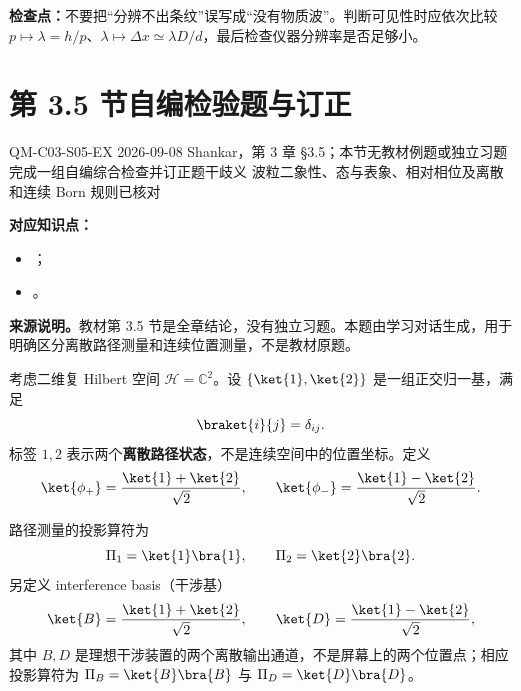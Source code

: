 \textbf{检查点：}不要把“分辨不出条纹”误写成“没有物质波”。判断可见性时应依次比较 $p\mapsto\lambda=h/p$、$\lambda\mapsto\Delta x\simeq\lambda D/d$，最后检查仪器分辨率是否足够小。

\section{第 3.5 节自编检验题与订正}
\label{exercise-set:QM-C03-S05}

\exercisemeta
  {QM-C03-S05-EX}
  {2026-09-08}
  {Shankar，第 3 章 \S 3.5；本节无教材例题或独立习题}
  {完成一组自编综合检查并订正题干歧义}
  {波粒二象性、态与表象、相对相位及离散和连续 Born 规则已核对}


\textbf{对应知识点：}
\begin{itemize}[leftmargin=*]
  \item {}；
  \item {}。
\end{itemize}

\textbf{来源说明。}教材第 3.5 节是全章结论，没有独立习题。本题由学习对话生成，用于明确区分离散路径测量和连续位置测量，不是教材原题。

考虑二维复 Hilbert 空间 $\mathcal H=\mathbb C^2$。设 $\{\ket{1},\ket{2}\}$ 是一组正交归一基，满足
\[
  \braket{i}{j}=\delta_{ij}.
\]
标签 $1,2$ 表示两个\textbf{离散路径状态}，不是连续空间中的位置坐标。定义
\begin{equation}
  \ket{\phi_+}
  =\frac{\ket{1}+\ket{2}}{\sqrt2},
  \qquad
  \ket{\phi_-}
  =\frac{\ket{1}-\ket{2}}{\sqrt2}.
  \label{eq:QM-C03-S05-E01-phase-states}
\end{equation}

路径测量的投影算符为
\[
  \Pi_1=\ket{1}\bra{1},
  \qquad
  \Pi_2=\ket{2}\bra{2}.
\]
另定义 interference basis（干涉基）
\begin{equation}
  \ket{B}
  =\frac{\ket{1}+\ket{2}}{\sqrt2},
  \qquad
  \ket{D}
  =\frac{\ket{1}-\ket{2}}{\sqrt2},
  \label{eq:QM-C03-S05-E01-interference-basis}
\end{equation}
其中 $B,D$ 是理想干涉装置的两个离散输出通道，不是屏幕上的两个位置点；相应投影算符为 $\Pi_B=\ket{B}\bra{B}$ 与 $\Pi_D=\ket{D}\bra{D}$。

